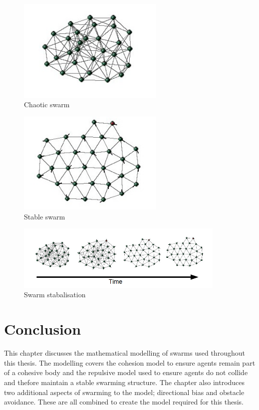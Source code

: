\begin{figure}[H]
\begin{center}
\includegraphics[width=7cm]{CHAPTER-2/figures/Chaos}
\end{center}
\caption{Chaotic swarm\label{methods:Chaos1}}
\end{figure}

\begin{figure}[H]
\begin{center}
\includegraphics[width=7cm]{CHAPTER-2/figures/Stable}
\end{center}
\caption{Stable swarm\label{methods:Stable1}}
\end{figure}

\begin{figure}[H]
\begin{center}
\includegraphics[width=10cm]{CHAPTER-2/figures/StableTime}
\end{center}
\caption{Swarm stabalisation\label{methods:StableTime1}}
\end{figure}

\section{Conclusion}
This chapter discusses the mathematical modelling of swarms used throughout this thesis. The modelling covers the cohesion model to ensure agents remain part of a cohesive body and the repulsive model used to ensure agents do not collide and thefore maintain a stable swarming structure. The chapter also introduces two additional aspects of swarming to the model; directional bias and obstacle avoidance. These are all combined to create the model required for this thesis. 


